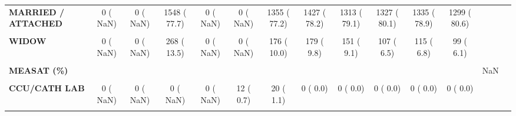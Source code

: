 \documentclass[
]{article}
\begin{document}
\begin{table}[H]
\begin{tabular}[t]{>{\raggedright\arraybackslash}p{5em}ccccccccccccc}
\textbf{MARRIED / ATTACHED} & 0 (  NaN) & 0 (  NaN) & 1548 ( 77.7) & 0 (  NaN) & 0 (  NaN) & 1355 ( 77.2) & 1427 ( 78.2) & 1313 ( 79.1) & 1327 ( 80.1) & 1335 ( 78.9) & 1299 ( 80.6) &  & \\
\textbf{\cellcolor{gray!10}{SINGLE}} & \cellcolor{gray!10}{0 (  NaN)} & \cellcolor{gray!10}{0 (  NaN)} & \cellcolor{gray!10}{74 (  3.7)} & \cellcolor{gray!10}{0 (  NaN)} & \cellcolor{gray!10}{0 (  NaN)} & \cellcolor{gray!10}{58 (  3.3)} & \cellcolor{gray!10}{70 (  3.8)} & \cellcolor{gray!10}{54 (  3.3)} & \cellcolor{gray!10}{69 (  4.2)} & \cellcolor{gray!10}{73 (  4.3)} & \cellcolor{gray!10}{54 (  3.3)} & \cellcolor{gray!10}{} & \cellcolor{gray!10}{}\\
\textbf{WIDOW} & 0 (  NaN) & 0 (  NaN) & 268 ( 13.5) & 0 (  NaN) & 0 (  NaN) & 176 ( 10.0) & 179 (  9.8) & 151 (  9.1) & 107 (  6.5) & 115 (  6.8) & 99 (  6.1) &  & \\
\textbf{\cellcolor{gray!10}{MARKERS = YES (\%)}} & \cellcolor{gray!10}{1016 ( 96.2)} & \cellcolor{gray!10}{1201 ( 97.0)} & \cellcolor{gray!10}{1333 ( 95.8)} & \cellcolor{gray!10}{1340 ( 98.7)} & \cellcolor{gray!10}{1256 ( 97.6)} & \cellcolor{gray!10}{1381 ( 96.4)} & \cellcolor{gray!10}{1556 ( 83.9)} & \cellcolor{gray!10}{1557 ( 91.3)} & \cellcolor{gray!10}{1530 ( 95.7)} & \cellcolor{gray!10}{1473 ( 92.8)} & \cellcolor{gray!10}{1203 ( 88.1)} & \cellcolor{gray!10}{<0.001} & \cellcolor{gray!10}{}\\
\textbf{MEASAT (\%)} &  &  &  &  &  &  &  &  &  &  &  & NaN & \\
\textbf{\cellcolor{gray!10}{AMBULANCE}} & \cellcolor{gray!10}{0 (  NaN)} & \cellcolor{gray!10}{0 (  NaN)} & \cellcolor{gray!10}{0 (  NaN)} & \cellcolor{gray!10}{0 (  NaN)} & \cellcolor{gray!10}{458 ( 26.3)} & \cellcolor{gray!10}{300 ( 16.9)} & \cellcolor{gray!10}{534 ( 28.3)} & \cellcolor{gray!10}{519 ( 29.3)} & \cellcolor{gray!10}{528 ( 43.6)} & \cellcolor{gray!10}{541 ( 30.9)} & \cellcolor{gray!10}{556 ( 32.1)} & \cellcolor{gray!10}{} & \cellcolor{gray!10}{}\\
\textbf{CCU/CATH LAB} & 0 (  NaN) & 0 (  NaN) & 0 (  NaN) & 0 (  NaN) & 12 (  0.7) & 20 (  1.1) & 0 (  0.0) & 0 (  0.0) & 0 (  0.0) & 0 (  0.0) & 0 (  0.0) &  & \\
\textbf{\cellcolor{gray!10}{ER}} & \cellcolor{gray!10}{0 (  NaN)} & \cellcolor{gray!10}{0 (  NaN)} & \cellcolor{gray!10}{0 (  NaN)} & \cellcolor{gray!10}{0 (  NaN)} & \cellcolor{gray!10}{742 ( 42.6)} & \cellcolor{gray!10}{665 ( 37.4)} & \cellcolor{gray!10}{612 ( 32.5)} & \cellcolor{gray!10}{489 ( 27.6)} & \cellcolor{gray!10}{0 (  0.0)} & \cellcolor{gray!10}{654 ( 37.4)} & \cellcolor{gray!10}{714 ( 41.2)} & \cellcolor{gray!10}{} & \cellcolor{gray!10}{}\\

\end{tabular}
\end{table}
\end{document}
